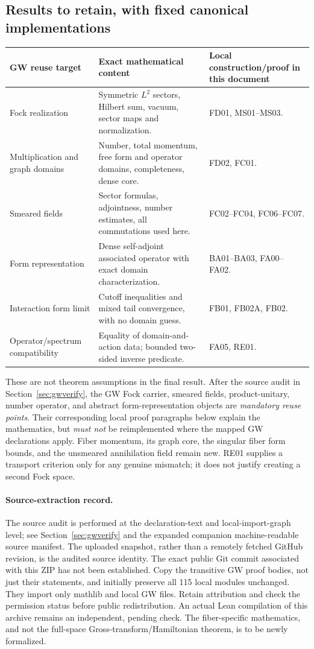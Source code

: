 \documentclass[11pt,a4paper]{article}
\theoremstyle{remark}\newtheorem{remark}[theorem]{Remark}
\begin{document}
\subsection{Results to retain, with fixed canonical implementations}\label{sec:localreuse}
\begin{longtable}{>{\raggedright\arraybackslash}p{}>{\raggedright\arraybackslash}p{}>{\raggedright\arraybackslash}p{}}
\toprule
GW reuse target & Exact mathematical content & Local construction/proof in this document\\\midrule\endhead
Fock realization & Symmetric $L^2$ sectors, Hilbert sum, vacuum, sector maps and normalization. & FD01, MS01--MS03.\\
Multiplication and graph domains & Number, total momentum, free form and operator domains, completeness, dense core. & FD02, FC01.\\
Smeared fields & Sector formulas, adjointness, number estimates, all commutations used here. & FC02--FC04, FC06--FC07.\\
Form representation & Dense self-adjoint associated operator with exact domain characterization. & BA01--BA03, FA00--FA02.\\
Interaction form limit & Cutoff inequalities and mixed tail convergence, with no domain guess. & FB01, FB02A, FB02.\\
Operator/spectrum compatibility & Equality of domain-and-action data; bounded two-sided inverse predicate. & FA05, RE01.\\
\bottomrule
\end{longtable}
These are not theorem assumptions in the final result. After the source audit in Section~\ref{sec:gwverify}, the GW Fock carrier, smeared fields, product-unitary, number operator, and abstract form-representation objects are \emph{mandatory reuse points}. Their corresponding local proof paragraphs below explain the mathematics, but \emph{must not} be reimplemented where the mapped GW declarations apply. Fiber momentum, its graph core, the singular fiber form bounds, and the unsmeared annihilation field remain new. RE01 supplies a transport criterion only for any genuine mismatch; it does not justify creating a second Fock space.

\paragraph{Source-extraction record.}
The source audit is performed at the declaration-text and local-import-graph level; see Section~\ref{sec:gwverify} and the expanded companion machine-readable source manifest. The uploaded snapshot, rather than a remotely fetched GitHub revision, is the audited source identity. The exact public Git commit associated with this ZIP has not been established. Copy the transitive GW proof bodies, not just their statements, and initially preserve all 115 local modules unchanged. They import only mathlib and local GW files. Retain attribution and check the permission status before public redistribution. An actual Lean compilation of this archive remains an independent, pending check. The fiber-specific mathematics, and not the full-space Gross-transform/Hamiltonian theorem, is to be newly formalized.
\end{document}
